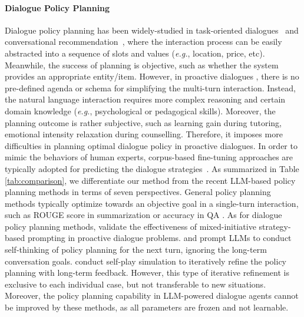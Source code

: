 \documentclass{article} %
\begin{document}
\paragraph{Dialogue Policy Planning}
Dialogue policy planning has been widely-studied in task-oriented dialogues~\citep{iclr22-gptcritic,iclr23-rewardtod}  and conversational recommendation~\citep{crs-survey}, where the interaction process can be easily abstracted into a sequence of slots and values (\textit{e.g.}, location, price, etc). Meanwhile, the success of planning is objective, such as whether the system provides an appropriate entity/item. However, in proactive dialogues \citep{proactive-survey,wsdm23-proactive}, there is no pre-defined agenda or schema for simplifying the multi-turn interaction. Instead, the natural language interaction requires more complex reasoning and certain domain knowledge (\textit{e.g.}, psychological or pedagogical skills). Moreover, the planning outcome is rather subjective, such as learning gain during tutoring, emotional intensity relaxation during counselling. Therefore, it imposes more difficulties in planning optimal dialogue policy in proactive dialogues. 
In order to mimic the behaviors of human experts, corpus-based fine-tuning approaches are typically adopted for predicting the dialogue  strategies~\citep{iclr21-negotiate-strategy,emnlp22-esc,eacl23-strategy-tutor}.  
As summarized in Table \ref{tab:comparison}, we differentiate our method from the recent LLM-based policy planning methods in terms of seven perspectives. 
General policy planning methods typically optimize towards an objective goal in a single-turn interaction, such as ROUGE score in summarization \citep{dsp} or accuracy in QA \citep{reflexion,yao2023retroformer}. 
As for dialogue policy planning methods, \citet{acl23-mixed} validate the effectiveness of mixed-initiative strategy-based prompting in proactive dialogue problems. 
\citet{llm-proactive} and \citet{acl23-askanexpert} prompt LLMs to conduct self-thinking of policy planning for the next turn, ignoring the long-term conversation goals. 
\citet{negotiate-selfplay} conduct self-play simulation to iteratively refine the policy planning with long-term feedback. 
However, this type of iterative refinement is exclusive to each individual case, but not transferable to new situations. 
Moreover, the policy planning capability in LLM-powered dialogue agents cannot be improved by these methods, as all parameters are frozen and not learnable. 
\end{document}
